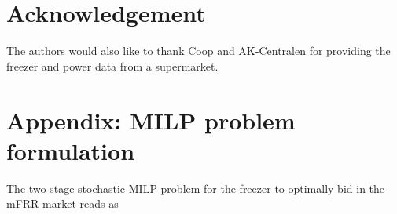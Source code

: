 \documentclass[11pt,a4paper]{article}
\begin{document}
\section*{Acknowledgement}

The authors would also like to thank Coop and AK-Centralen for providing the freezer and power data from a supermarket.

\section*{Appendix: MILP problem formulation}\label{appendix:A}

\begingroup
\allowdisplaybreaks
The two-stage stochastic MILP problem for the freezer to optimally bid in the mFRR market reads as
%
\end{document}
